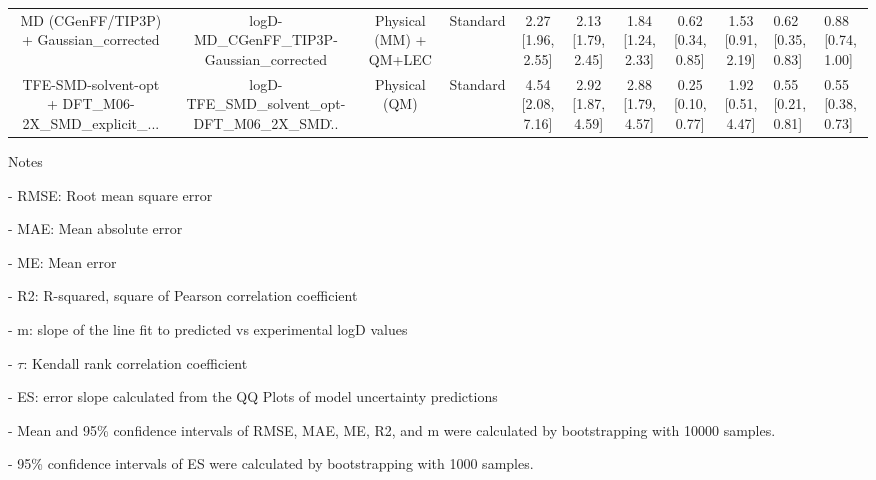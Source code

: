\documentclass{article}
\begin{document}
\begin{center}
\begin{longtable}{|ccccccccc|}
            MD (CGenFF/TIP3P) + Gaussian_corrected &         logD-MD\_CGenFF\_TIP3P-Gaussian\_corrected &  Physical (MM) + QM+LEC &   Standard &  2.27 [1.96, 2.55] &  2.13 [1.79, 2.45] &     1.84 [1.24, 2.33] &  0.62 [0.34, 0.85] &  1.53 [0.91, 2.19] &   0.62 [0.35, 0.83] &   0.88 [0.74, 1.00] \\
 TFE-SMD-solvent-opt + DFT_M06-2X_SMD_explicit_... &  logD-TFE\_SMD\_solvent\_opt-DFT\_M06\_2X\_SMD\... &           Physical (QM) &   Standard &  4.54 [2.08, 7.16] &  2.92 [1.87, 4.59] &     2.88 [1.79, 4.57] &  0.25 [0.10, 0.77] &  1.92 [0.51, 4.47] &   0.55 [0.21, 0.81] &   0.55 [0.38, 0.73] \\
\end{longtable}
\end{center}

Notes

- RMSE: Root mean square error

- MAE: Mean absolute error

- ME: Mean error

- R2: R-squared, square of Pearson correlation coefficient

- m: slope of the line fit to predicted vs experimental logD values

- $\tau$:  Kendall rank correlation coefficient

- ES: error slope calculated from the QQ Plots of model uncertainty predictions

- Mean and 95\% confidence intervals of RMSE, MAE, ME, R2, and m were calculated by bootstrapping with 10000 samples.

- 95\% confidence intervals of ES were calculated by bootstrapping with 1000 samples.\end{document}
\end{document}
